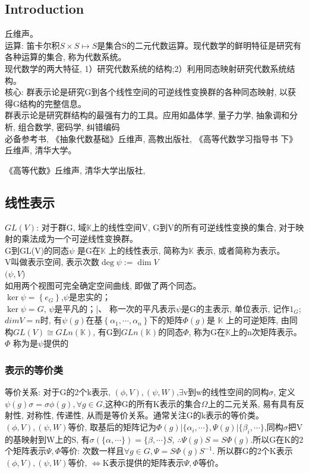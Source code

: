 \documentclass[UTF8]{../../09-Mathematics}
\begin{document}
\subsection{Introduction}
丘维声。\\
运算: 笛卡尔积$S \times S \mapsto S$是集合S的二元代数运算。现代数学的鲜明特征是研究有各种运算的集合, 称为代数系统。\\
现代数学的两大特征, 1）研究代数系统的结构;2）利用同态映射研究代数系统结构。\\
核心: 群表示论是研究G到各个线性空间的可逆线性变换群的各种同态映射, 以获得G结构的完整信息。\\
群表示论是研究群结构的最强有力的工具。应用如晶体学, 量子力学, 抽象调和分析, 组合数学, 密码学, 纠错编码\\
必备参考书, 《抽象代数基础》丘维声, 高教出版社, 《高等代数学习指导书 下》丘维声, 清华大学。

《高等代数》丘维声, 清华大学出版社, 




\subsection{线性表示}
$GL(V)$: 对于群G, 域$\mathbb K$上的线性空间V, G到V的所有可逆线性变换的集合, 对于映射的乘法成为一个可逆线性变换群。\\
G到GL(V)的同态$\psi $ 是G在$\mathbb K$ 上的线性表示, 简称为$\mathbb K$ 表示, 或者简称为表示。\\
V叫做表示空间, 表示次数$\deg \psi := \dim V$\\
$(\psi ,V$)\\
如用两个视图可完全确定空间曲线, 即做了两个同态。\\
$\ker \psi =\left\{ e_G \right\}$,$\psi $是忠实的；\\
$\ker \psi =G$, $\psi$是平凡的；|、
称一次的平凡表示$\psi $是G的主表示, 单位表示, 记作$1_G$;\\
$dimV=n$时, 有$\psi (g)$在基$\left\{ \alpha_1,\cdots , \alpha_n \right\}$下的矩阵$\Phi(g)$是 $\mathbb K$ 上的可逆矩阵, 由同构$GL(V) \cong GLn(\mathbb K)$, 有G到$GLn(\mathbb K)$的同态$\Phi$, 称为G在$\mathbb K$上的n次矩阵表示。\\
$\Phi $ 称为是$\psi $提供的

\subsubsection{表示的等价类}
等价关系: 对于G的2个k表示, $(\phi,V),(\psi,W)$,$\exists$v到w的线性空间的同构$\sigma$, 定义$\psi(g)\sigma =\sigma \phi (g), \forall g \in G$,这种G的所有K表示的集合$\Omega$上的二元关系, 易有具有反射性, 对称性, 传递性, 从而是等价关系。通常关注G的k表示的等价类。\\
$(\phi,V),(\psi,W)$等价, 取基后的矩阵记为$\Phi (g)| \{\alpha _i, \cdots\},\Psi (g)| \{\beta _i, \cdots\}$,同构$\sigma$把V的基映射到W上的S, 有$\sigma (\{\alpha , \cdots\})=\{\beta, \cdots\}S$, $\therefore \Psi (g)S=S\Phi(g)$.所以G在K的2个矩阵表示$\Psi, \Phi$等价: 次数一样且$\forall g \in G,\Psi =S\Phi (g)S^{-1}$. 所以群G的2个K表示$(\phi,V),(\psi,W)$等价, $\Leftrightarrow$K表示提供的矩阵表示$\Psi, \Phi$等价。
\end{document}
